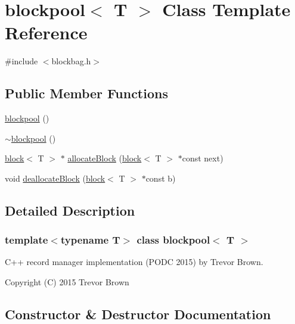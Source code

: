 \hypertarget{classblockpool}{}\section{blockpool$<$ T $>$ Class Template Reference}
\label{classblockpool}


{\ttfamily \#include $<$blockbag.\+h$>$}

\subsection*{Public Member Functions}
\begin{DoxyCompactItemize}
\item 
\hyperlink{classblockpool_a110934720ff65d68f413bae0c0c577bb}{blockpool} ()
\item 
\hyperlink{classblockpool_a4f9b57b1f040a7940d4838ae293b91b1}{$\sim$blockpool} ()
\item 
\hyperlink{classblock}{block}$<$ T $>$ $\ast$ \hyperlink{classblockpool_ab0c6542e74f50af2cc27ae2a18200cc6}{allocate\+Block} (\hyperlink{classblock}{block}$<$ T $>$ $\ast$const next)
\item 
void \hyperlink{classblockpool_a513720b0f74d4cec679eff69b3dd8d34}{deallocate\+Block} (\hyperlink{classblock}{block}$<$ T $>$ $\ast$const b)
\end{DoxyCompactItemize}


\subsection{Detailed Description}
\subsubsection*{template$<$typename T$>$\newline
class blockpool$<$ T $>$}

C++ record manager implementation (P\+O\+DC 2015) by Trevor Brown.

Copyright (C) 2015 Trevor Brown 

\subsection{Constructor \& Destructor Documentation}
\mbox{\label{classblockpool_a110934720ff65d68f413bae0c0c577bb}} 
